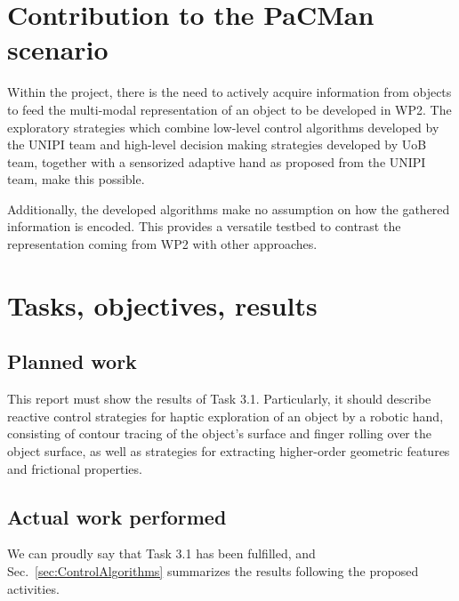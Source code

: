 \documentclass[a4paper,11pt,pdf]{pacmanreport}
\begin{document}
\section*{Contribution to the PaCMan scenario}

Within the project, there is the need to actively acquire information from objects to feed the multi-modal representation of an object to be developed in WP2. The exploratory strategies which combine low-level control algorithms developed by the UNIPI team and high-level decision making strategies developed by UoB team, together with a sensorized adaptive hand as proposed from the UNIPI team, make this possible.

Additionally, the developed algorithms make no assumption on how the gathered information is encoded. This provides a versatile testbed to contrast the representation coming from WP2 with other approaches.

\newpage

\section{Tasks, objectives, results}

\subsection{Planned work}

This report must show the results of Task 3.1. Particularly, it should describe reactive control strategies for haptic exploration of an object by a robotic hand, consisting of contour tracing of the object's surface and finger rolling over the object surface, as well as strategies for extracting higher-order geometric features and frictional properties.

\subsection{Actual work performed}

We can proudly say that Task 3.1 has been fulfilled, and Sec.~\ref{sec:ControlAlgorithms} summarizes the results following the proposed activities.

\end{document}
